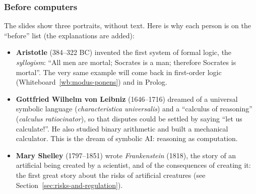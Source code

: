 \begin{center}
\label{fig:ai-timeline}
\end{center}

\subsubsection{Before computers}

The slides show three portraits, without text. Here is why each person is on the
``before'' list (the explanations are added):
\begin{itemize}[nosep]
  \item \textbf{Aristotle} (384--322 BC) invented the first system of formal logic, the
        \emph{syllogism}: ``All men are mortal; Socrates is a man; therefore Socrates is
        mortal''. The very same example will come back in first-order logic
        (Whiteboard~\ref{wb:modus-ponens}) and in Prolog.
  \item \textbf{Gottfried Wilhelm von Leibniz} (1646--1716) dreamed of a universal symbolic
        language (\emph{characteristica universalis}) and a ``calculus of reasoning''
        (\emph{calculus ratiocinator}), so that disputes could be settled by saying
        ``let us calculate!''. He also studied binary arithmetic and built a mechanical
        calculator. This is the dream of symbolic AI: reasoning as computation.
  \item \textbf{Mary Shelley} (1797--1851) wrote \emph{Frankenstein} (1818), the story of an
        artificial being created by a scientist, and of the consequences of creating it:
        the first great story about the risks of artificial creatures
        (see Section~\ref{sec:risks-and-regulation}).
\end{itemize}

